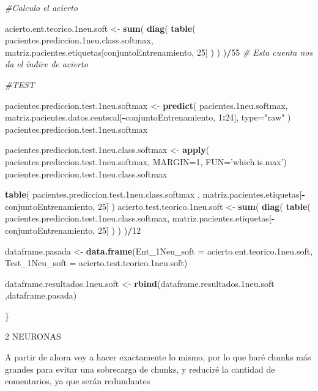 \documentclass[]{article}
\newenvironment{Shaded}{\begin{snugshade}}{\end{snugshade}}
\newcommand{\KeywordTok}[1]{\textcolor[rgb]{0.13,0.29,0.53}{\textbf{#1}}}
\newcommand{\DataTypeTok}[1]{\textcolor[rgb]{0.13,0.29,0.53}{#1}}
\newcommand{\DecValTok}[1]{\textcolor[rgb]{0.00,0.00,0.81}{#1}}
\newcommand{\StringTok}[1]{\textcolor[rgb]{0.31,0.60,0.02}{#1}}
\newcommand{\CommentTok}[1]{\textcolor[rgb]{0.56,0.35,0.01}{\textit{#1}}}
\newcommand{\OperatorTok}[1]{\textcolor[rgb]{0.81,0.36,0.00}{\textbf{#1}}}
\newcommand{\NormalTok}[1]{#1}
\begin{document}
\begin{Shaded}
\begin{Highlighting}[]
  \CommentTok{#Calculo el acierto}
  
\NormalTok{  acierto.ent.teorico.1neu.soft <-}\StringTok{ }\KeywordTok{sum}\NormalTok{( }\KeywordTok{diag}\NormalTok{( }\KeywordTok{table}\NormalTok{( pacientes.prediccion.1neu.class.softmax, matriz.pacientes.etiquetas[conjuntoEntrenamiento, }\DecValTok{25}\NormalTok{] ) ) )}\OperatorTok{/}\DecValTok{55} \CommentTok{# Esta cuenta nos da el índice de acierto}
  
  \CommentTok{#TEST}
  
\NormalTok{  pacientes.prediccion.test.1neu.softmax <-}\StringTok{ }\KeywordTok{predict}\NormalTok{( pacientes.1neu.softmax, matriz.pacientes.datos.centscal[}\OperatorTok{-}\NormalTok{conjuntoEntrenamiento, }\DecValTok{1}\OperatorTok{:}\DecValTok{24}\NormalTok{], }\DataTypeTok{type=}\StringTok{"raw"}\NormalTok{ )}
\NormalTok{  pacientes.prediccion.test.1neu.softmax}
  
\NormalTok{  pacientes.prediccion.test.1neu.class.softmax <-}\StringTok{ }\KeywordTok{apply}\NormalTok{( pacientes.prediccion.test.1neu.softmax, }\DataTypeTok{MARGIN=}\DecValTok{1}\NormalTok{, }\DataTypeTok{FUN=}\StringTok{'which.is.max'}\NormalTok{)}
\NormalTok{  pacientes.prediccion.test.1neu.class.softmax}
  
  \KeywordTok{table}\NormalTok{( pacientes.prediccion.test.1neu.class.softmax , matriz.pacientes.etiquetas[}\OperatorTok{-}\NormalTok{conjuntoEntrenamiento, }\DecValTok{25}\NormalTok{] )}
\NormalTok{  acierto.test.teorico.1neu.soft <-}\StringTok{ }\KeywordTok{sum}\NormalTok{( }\KeywordTok{diag}\NormalTok{( }\KeywordTok{table}\NormalTok{( pacientes.prediccion.test.1neu.class.softmax, matriz.pacientes.etiquetas[}\OperatorTok{-}\NormalTok{conjuntoEntrenamiento, }\DecValTok{25}\NormalTok{] ) ) )}\OperatorTok{/}\DecValTok{12}
  
\NormalTok{  dataframe.pasada <-}\StringTok{ }\KeywordTok{data.frame}\NormalTok{(}\DataTypeTok{Ent_1Neu_soft =}\NormalTok{ acierto.ent.teorico.1neu.soft,}
                                 \DataTypeTok{Test_1Neu_soft =}\NormalTok{ acierto.test.teorico.1neu.soft)}
  
\NormalTok{  dataframe.resultados.1neu.soft <-}\StringTok{ }\KeywordTok{rbind}\NormalTok{(dataframe.resultados.1neu.soft ,dataframe.pasada)}
  
\NormalTok{\}}
\end{Highlighting}
\end{Shaded}

2 NEURONAS

A partir de ahora voy a hacer exactamente lo mismo, por lo que haré
chunks más grandes para evitar una sobrecarga de chunks, y reduciré la
cantidad de comentarios, ya que serán redundantes
\end{document}
